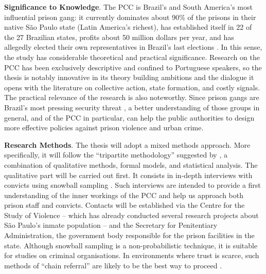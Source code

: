 \documentclass[a4paper,11pt]{article}
\begin{document}
\vspace{.45cm}

\noindent \textbf{Significance to Knowledge}. The PCC is Brazil's and South America's most influential prison gang: it currently dominates about 90\% of the prisons in their native São Paulo state (Latin America's richest), has established itself in 22 of the 27 Brazilian states, profits about 50 million dollars per year, and has allegedly elected their own representatives in Brazil's last elections \citep{biondi2008etica, veja2013}. In this sense, the study has considerable theoretical and practical significance. Research on the PCC has been exclusively descriptive and confined to Portuguese speakers, so the thesis is notably innovative in its theory building ambitions and the dialogue it opens with the literature on collective action, state formation, and costly signals. The practical relevance of the research is also noteworthy. Since prison gangs are Brazil's most pressing security threat \citep{dias2011pulverizaccao}, a better understanding of those groups in general, and of the PCC in particular, can help the public authorities to design more effective policies against prison violence and urban crime.

\newpage

\noindent \textbf{Research Methods}. The thesis will adopt a mixed methods approach. More specifically, it will follow the ``tripartite methodology'' suggested by \citet[165]{laitin2003perestroikan}, a combination of qualitative methods, formal models, and statistical analysis. The qualitative part will be carried out first. It consists in in-depth interviews with convicts using snowball sampling \citep{goodman1961snowball}. Such interviews are intended to provide a first understanding of the inner workings of the PCC and help us approach both prison staff and convicts. Contacts will be established via the Centre for the Study of Violence -- which has already conducted several research projects about São Paulo's inmate population -- and the Secretary for Penitentiary Administration, the government body responsible for the prison facilities in the state. Although snowball sampling is a non-probabilistic technique, it is suitable for studies on criminal organisations. In environments where trust is scarce, such methods of ``chain referral'' are likely to be the best way to proceed \citep{johnston2010sampling}.
\end{document}
